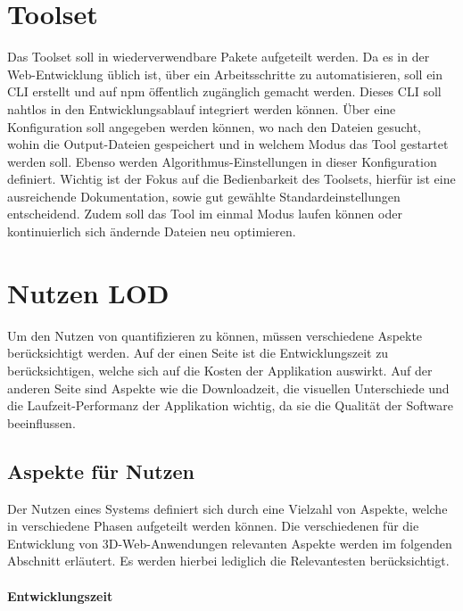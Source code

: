 \section{Toolset}
Das Toolset soll in wiederverwendbare Pakete aufgeteilt werden.
Da es in der Web-Entwicklung üblich ist, über ein  Arbeitsschritte zu automatisieren, soll ein \gls{CLI} erstellt und auf \gls{npm} öffentlich zugänglich gemacht werden. Dieses \gls{CLI} soll nahtlos in den Entwicklungsablauf integriert werden können. Über eine Konfiguration soll angegeben werden können, wo nach den  Dateien gesucht, wohin die Output-Dateien gespeichert und in welchem Modus das Tool gestartet werden soll. Ebenso werden Algorithmus-Einstellungen in dieser Konfiguration definiert. Wichtig ist der Fokus auf die Bedienbarkeit des Toolsets, hierfür ist eine ausreichende Dokumentation, sowie gut gewählte Standardeinstellungen entscheidend. Zudem soll das Tool im einmal Modus laufen können oder kontinuierlich sich ändernde Dateien neu optimieren.

\section{Nutzen LOD}
Um den Nutzen von  quantifizieren zu können, müssen verschiedene Aspekte berücksichtigt werden. Auf der einen Seite ist die Entwicklungszeit zu berücksichtigen, welche sich auf die Kosten der Applikation auswirkt. Auf der anderen Seite sind Aspekte wie die Downloadzeit, die visuellen Unterschiede und die Laufzeit-Performanz der Applikation wichtig, da sie die Qualität der Software beeinflussen.

\subsection{Aspekte für Nutzen}

Der Nutzen eines Systems definiert sich durch eine Vielzahl von Aspekte, welche in verschiedene Phasen aufgeteilt werden können. Die verschiedenen für die Entwicklung von 3D-Web-Anwendungen relevanten Aspekte werden im folgenden Abschnitt erläutert. Es werden hierbei lediglich die Relevantesten berücksichtigt.

\paragraph{Entwicklungszeit}

